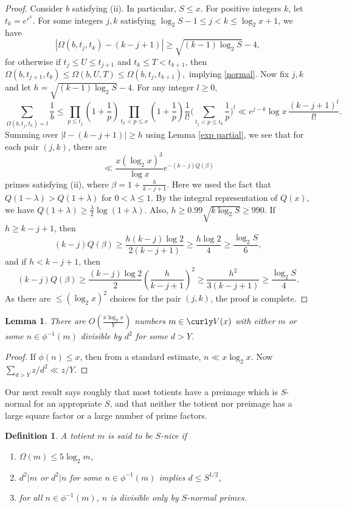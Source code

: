 \documentclass[11pt]{amsart}
\theoremstyle{remark}
\theoremstyle{plain}
\newtheorem{lem}{Lemma}[section]
\newtheorem{defn}{Definition}
\numberwithin{equation}{section}
\newcommand{\be}{\begin{equation}}
\newcommand{\ee}{\end{equation}}
\newcommand{\lam}{\ensuremath{\lambda}}
\renewcommand{\b}{\ensuremath{\beta}}
\renewcommand{\(}{\left(}
\renewcommand{\)}{\right)}
\newcommand{\pfrac}[2]{\left(\frac{#1}{#2}\right)}
\newcommand{\fancyV}{\curly V}
\renewcommand{\le}{\leqslant}
\renewcommand{\ge}{\geqslant}
\newcommand{\om}{\Omega}
\begin{document}
\begin{proof}
Consider $b$ satisfying (ii).  In particular, $S\le x$.
For positive integers $k$, let $t_k=e^{e^k}$.
For some integers $j,k$ satisfying
$\log_2 S-1 \le j<k \le \log_2 x+1$, we have
\be\label{omtjtk}
|\om(b,t_j,t_k)-(k-j+1)| \ge \sqrt{(k-1)\log_2 S} - 4,
\ee
for otherwise if $t_{j} \le U \le t_{j+1}$ and $t_k
\le T < t_{k+1}$, then $\om(b,t_{j+1},t_k) \le \om(b,U,T) \le \om(b,t_j,t_{k+1}),$ 
implying \eqref{normal}.  Now fix $j,k$ and let 
$h=\sqrt{(k-1)\log_2 S} - 4$.  For any integer $l\ge 0$,
\[
\sum_{\om(b,t_j,t_k)=l} \frac{1}{b} \le \prod_{p\le t_j} \(1+\frac{1}{p}\)
  \prod_{t_k<p\le x} \(1+\frac{1}{p}\) \frac{1}{l!} \Bigg( \sum_{t_j<p\le t_k}  
  \frac{1}{p} \Bigg)^l \ll e^{j-k} \log x \, \frac{(k-j+1)^l}{l!}.
\]
Summing over $|l-(k-j+1)| \ge h$ using Lemma \ref{exp partial}, 
we see that for each pair $(j,k)$, there are
\[
 \ll \frac{x(\log_2 x)^3}{\log x} e^{-(k-j)Q(\beta)}
\]
primes satisfying (ii),  where $\beta=1+\frac{h}{k-j+1}$.
Here we used the fact that $Q(1-\lam)>Q(1+\lam)$ for $0 < \lam \le 1$.
By the integral representation of $Q(x)$, we have $Q(1+\lam)\ge \frac{\lam}{2}
\log(1+\lam)$.  Also, $h\ge 0.99 \sqrt{k\log_2 S} \ge 990.$
If $h\ge k-j+1$, then 
$$
(k-j)Q(\b) \ge \frac{h(k-j)\log 2}{2(k-j+1)} \ge \frac{h\log 2}{4} \ge 
\frac{\log_2 S}{6},
$$
and if $h<k-j+1$, then
$$
(k-j) Q(\b) \ge \frac{(k-j)\log 2}{2} \pfrac{h}{k-j+1}^2 \ge
\frac{h^2}{3(k-j+1)} \ge \frac{\log_2 S}{4}.
$$
 As there are 
$\le (\log_2 x)^2$ choices for the pair $(j,k)$, the proof is complete.
\end{proof}



\begin{lem} \label{divisor squares} There are $O(\frac{x\log_2 x}{Y})$ numbers
$m \in \fancyV(x)$ with either $m$ or some $n \in \phi^{-1}(m)$ divisible by $d^2$
for some $d>Y$.
\end{lem}

\begin{proof}  If $\phi(n)\le x$, then from a standard estimate,
$n\ll x\log_2 x$.  Now $\sum_{d>Y} z/d^2 \ll z/Y$. 
\end{proof}

Our next result says roughly that most totients have a preimage which is $S$-normal 
for an appropriate $S$, and that neither the totient nor preimage has a large square factor or a large number of prime factors.

\begin{defn}
 A totient $m$ is said to be $S$-nice if
\begin{enumerate}
 \item[(a)] $\Omega(m)\le 5\log_2 m$,
\item[(b)] $d^2|m$ or $d^2|n$ for some $n\in \phi^{-1}(m)$ implies $d\le S^{1/2}$,
\item[(c)] for all $n\in \phi^{-1}(m)$, $n$ is divisible only by $S$-normal primes.
\end{enumerate}
\end{defn}
\end{document}
